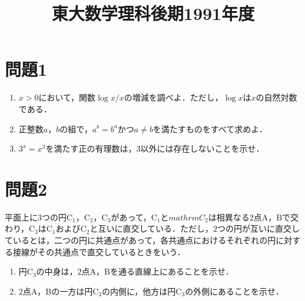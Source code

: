 \documentclass[unicode,12pt, A4j]{ltjsarticle}%
\title{東大数学理科後期1991年度}
\author{}
\date{}
\begin{document}
\maketitle

\section{問題1}
\begin{enumerate}
 \item $x>0$において，関数$\log x/x$の増減を調べよ．ただし，$\log x$は$x$の自然対数である．
 \item 正整数$a$，$b$の組で，$a^b=b^a$かつ$a\neq b$を満たすものをすべて求めよ．
 \item $3^x=x^3$を満たす正の有理数は，$3$以外には存在しないことを示せ．
\end{enumerate}

\section{問題2}
平面上に$3$つの円$\mathrm{C}_1$，$\mathrm{C}_2$，$\mathrm{C}_3$があって，$\mathrm{C}_1$と$mathrm{C}_2$は相異なる$2$点$\mathrm{A}$，$\mathrm{B}$で交わり，$\mathrm{C}_3$は$\mathrm{C}_1$および$\mathrm{C}_2$と互いに直交している．ただし，$2$つの円が互いに直交しているとは，二つの円に共通点があって，各共通点におけるそれぞれの円に対する接線がその共通点で直交しているときをいう．
\begin{enumerate}
 \item 円$\mathrm{C}_3$の中身は，$2$点$\mathrm{A}$，$\mathrm{B}$を通る直線上にあることを示せ．
 \item $2$点$\mathrm{A}$，$\mathrm{B}$の一方は円$\mathrm{C}_3$の内側に，他方は円$\mathrm{C}_3$の外側にあることを示せ．
\end{enumerate}
\end{document}
